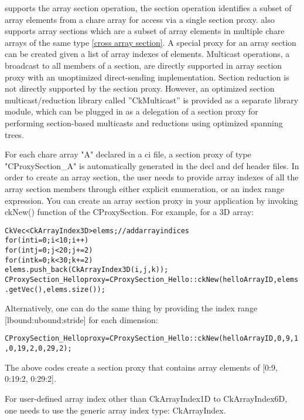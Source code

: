 \charmpp{} supports the array section operation, the section operation identifies a subset of array 
elements from a chare array for access via a single section proxy. \charmpp{} also supports array sections
which are a subset of array elements in multiple chare arrays of the
same type \ref{cross array section}.
A special proxy for an array section can be created given a list of array
indexes of elements.
Multicast operations, a broadcast to all members of a section, are directly supported in array section proxy with
an unoptimized direct-sending implementation.
Section reduction is not directly supported by the section proxy. 
However, an optimized section multicast/reduction 
library called ''CkMulticast'' is provided as a separate library module,
which can be plugged in as a delegation of a section proxy for performing
section-based multicasts and reductions using optimized spanning trees. 

For each chare array "A" declared in a ci file, a section proxy 
of type "CProxySection\_A" is automatically generated in the decl and def 
header files. 
In order to create an array section, the user needs to provide array indexes 
of all the array section members through either explicit enumeration, or an index range expression.
You can create an array section proxy in your application by 
invoking ckNew() function of the CProxySection.
For example, for a 3D array:

\begin{alltt}
  CkVec<CkArrayIndex3D> elems;    // add array indices
  for (int i=0; i<10; i++)
    for (int j=0; j<20; j+=2)
      for (int k=0; k<30; k+=2)
         elems.push_back(CkArrayIndex3D(i, j, k));
  CProxySection_Hello proxy = CProxySection_Hello::ckNew(helloArrayID, elems.getVec(), elems.size());
\end{alltt}

Alternatively, one can do the same thing by providing the index range [lbound:ubound:stride] 
for each dimension:

\begin{alltt}
  CProxySection_Hello proxy = CProxySection_Hello::ckNew(helloArrayID, 0, 9, 1, 0, 19, 2, 0, 29, 2);
\end{alltt}

The above codes create a section proxy that contains array elements of 
[0:9, 0:19:2, 0:29:2].

For user-defined array index other than CkArrayIndex1D to CkArrayIndex6D,
one needs to use the generic array index type: CkArrayIndex.

